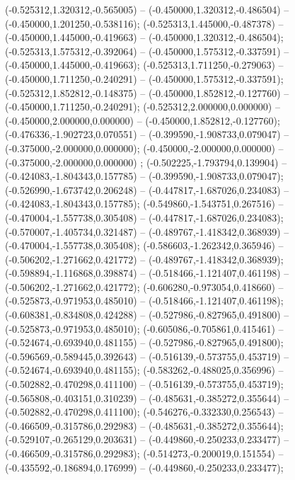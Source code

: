  (-0.525312,1.320312,-0.565005) -- (-0.450000,1.320312,-0.486504) -- (-0.450000,1.201250,-0.538116);
 (-0.525313,1.445000,-0.487378) -- (-0.450000,1.445000,-0.419663) -- (-0.450000,1.320312,-0.486504);
 (-0.525313,1.575312,-0.392064) -- (-0.450000,1.575312,-0.337591) -- (-0.450000,1.445000,-0.419663);
 (-0.525313,1.711250,-0.279063) -- (-0.450000,1.711250,-0.240291) -- (-0.450000,1.575312,-0.337591);
 (-0.525312,1.852812,-0.148375) -- (-0.450000,1.852812,-0.127760) -- (-0.450000,1.711250,-0.240291);
 (-0.525312,2.000000,0.000000) -- (-0.450000,2.000000,0.000000) -- (-0.450000,1.852812,-0.127760);
 (-0.476336,-1.902723,0.070551) -- (-0.399590,-1.908733,0.079047) -- (-0.375000,-2.000000,0.000000);
 (-0.450000,-2.000000,0.000000) -- (-0.375000,-2.000000,0.000000) ;
 (-0.502225,-1.793794,0.139904) -- (-0.424083,-1.804343,0.157785) -- (-0.399590,-1.908733,0.079047);
 (-0.526990,-1.673742,0.206248) -- (-0.447817,-1.687026,0.234083) -- (-0.424083,-1.804343,0.157785);
 (-0.549860,-1.543751,0.267516) -- (-0.470004,-1.557738,0.305408) -- (-0.447817,-1.687026,0.234083);
 (-0.570007,-1.405734,0.321487) -- (-0.489767,-1.418342,0.368939) -- (-0.470004,-1.557738,0.305408);
 (-0.586603,-1.262342,0.365946) -- (-0.506202,-1.271662,0.421772) -- (-0.489767,-1.418342,0.368939);
 (-0.598894,-1.116868,0.398874) -- (-0.518466,-1.121407,0.461198) -- (-0.506202,-1.271662,0.421772);
 (-0.606280,-0.973054,0.418660) -- (-0.525873,-0.971953,0.485010) -- (-0.518466,-1.121407,0.461198);
 (-0.608381,-0.834808,0.424288) -- (-0.527986,-0.827965,0.491800) -- (-0.525873,-0.971953,0.485010);
 (-0.605086,-0.705861,0.415461) -- (-0.524674,-0.693940,0.481155) -- (-0.527986,-0.827965,0.491800);
 (-0.596569,-0.589445,0.392643) -- (-0.516139,-0.573755,0.453719) -- (-0.524674,-0.693940,0.481155);
 (-0.583262,-0.488025,0.356996) -- (-0.502882,-0.470298,0.411100) -- (-0.516139,-0.573755,0.453719);
 (-0.565808,-0.403151,0.310239) -- (-0.485631,-0.385272,0.355644) -- (-0.502882,-0.470298,0.411100);
 (-0.546276,-0.332330,0.256543) -- (-0.466509,-0.315786,0.292983) -- (-0.485631,-0.385272,0.355644);
 (-0.529107,-0.265129,0.203631) -- (-0.449860,-0.250233,0.233477) -- (-0.466509,-0.315786,0.292983);
 (-0.514273,-0.200019,0.151554) -- (-0.435592,-0.186894,0.176999) -- (-0.449860,-0.250233,0.233477);
